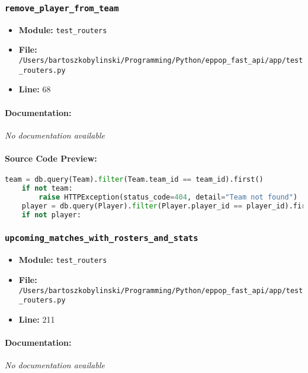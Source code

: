 \documentclass[11pt,a4paper]{article}
\begin{document}
\vspace{1em}
\subsubsection{\texttt{remove\_player\_from\_team}}

\begin{itemize}
    \item \textbf{Module:} \texttt{test\_routers}
    \item \textbf{File:} \texttt{/Users/bartoszkobylinski/Programming/Python/eppop\_fast\_api/app/test\_routers.py}
    \item \textbf{Line:} 68
\end{itemize}

\paragraph{Documentation:} \textit{No documentation available}

\paragraph{Source Code Preview:}
\begin{lstlisting}[language=Python]
    team = db.query(Team).filter(Team.team_id == team_id).first()
    if not team:
        raise HTTPException(status_code=404, detail="Team not found")
    player = db.query(Player).filter(Player.player_id == player_id).first()
    if not player:
\end{lstlisting}

\vspace{1em}
\subsubsection{\texttt{upcoming\_matches\_with\_rosters\_and\_stats}}

\begin{itemize}
    \item \textbf{Module:} \texttt{test\_routers}
    \item \textbf{File:} \texttt{/Users/bartoszkobylinski/Programming/Python/eppop\_fast\_api/app/test\_routers.py}
    \item \textbf{Line:} 211
\end{itemize}

\paragraph{Documentation:} \textit{No documentation available}
\end{document}
